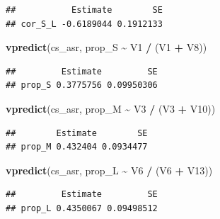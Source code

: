 \documentclass[
  12pt,
]{book}
\newenvironment{Shaded}{\begin{snugshade}}{\end{snugshade}}
\newcommand{\KeywordTok}[1]{\textcolor[rgb]{0.13,0.29,0.53}{\textbf{#1}}}
\newcommand{\NormalTok}[1]{#1}
\newcommand{\OperatorTok}[1]{\textcolor[rgb]{0.81,0.36,0.00}{\textbf{#1}}}
\newcommand{\StringTok}[1]{\textcolor[rgb]{0.31,0.60,0.02}{#1}}
\begin{document}
\begin{verbatim}
##           Estimate        SE
## cor_S_L -0.6189044 0.1912133
\end{verbatim}

\begin{Shaded}
\begin{Highlighting}[]
\KeywordTok{vpredict}\NormalTok{(cs\_asr, prop\_S }\OperatorTok{\textasciitilde{}}\StringTok{ }\NormalTok{V1 }\OperatorTok{/}\StringTok{ }\NormalTok{(V1 }\OperatorTok{+}\StringTok{ }\NormalTok{V8))}
\end{Highlighting}
\end{Shaded}

\begin{verbatim}
##         Estimate         SE
## prop_S 0.3775756 0.09950306
\end{verbatim}

\begin{Shaded}
\begin{Highlighting}[]
\KeywordTok{vpredict}\NormalTok{(cs\_asr, prop\_M }\OperatorTok{\textasciitilde{}}\StringTok{ }\NormalTok{V3 }\OperatorTok{/}\StringTok{ }\NormalTok{(V3 }\OperatorTok{+}\StringTok{ }\NormalTok{V10))}
\end{Highlighting}
\end{Shaded}

\begin{verbatim}
##        Estimate        SE
## prop_M 0.432404 0.0934477
\end{verbatim}

\begin{Shaded}
\begin{Highlighting}[]
\KeywordTok{vpredict}\NormalTok{(cs\_asr, prop\_L }\OperatorTok{\textasciitilde{}}\StringTok{ }\NormalTok{V6 }\OperatorTok{/}\StringTok{ }\NormalTok{(V6 }\OperatorTok{+}\StringTok{ }\NormalTok{V13))}
\end{Highlighting}
\end{Shaded}

\begin{verbatim}
##         Estimate         SE
## prop_L 0.4350067 0.09498512
\end{verbatim}
\end{document}
